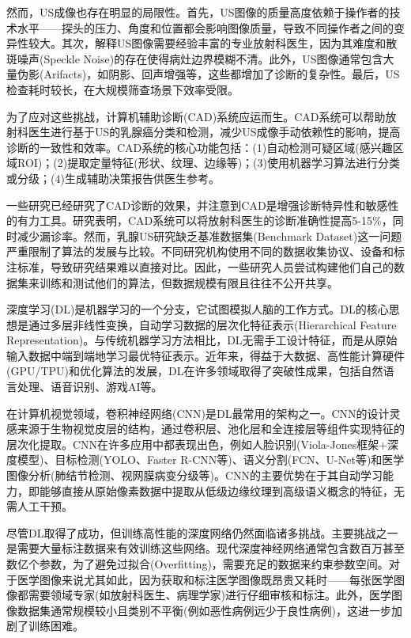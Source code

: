 \documentclass[supercite]{../Hust-undergraduate-translation/Experimental_Report}
\theoremstyle{definition}
\begin{document}
然而，US成像也存在明显的局限性。首先，US图像的质量高度依赖于操作者的技术水平——探头的压力、角度和位置都会影响图像质量，导致不同操作者之间的变异性较大。其次，解释US图像需要经验丰富的专业放射科医生，因为其难度和散斑噪声(Speckle Noise)的存在使得病灶边界模糊不清。此外，US图像通常包含大量伪影(Arifacts)，如阴影、回声增强等，这些都增加了诊断的复杂性。最后，US检查耗时较长，在大规模筛查场景下效率受限。

为了应对这些挑战，计算机辅助诊断(CAD)系统应运而生。CAD系统可以帮助放射科医生进行基于US的乳腺癌分类和检测，减少US成像手动依赖性的影响，提高诊断的一致性和效率。CAD系统的核心功能包括：(1)自动检测可疑区域(感兴趣区域ROI)；(2)提取定量特征(形状、纹理、边缘等)；(3)使用机器学习算法进行分类或分级；(4)生成辅助决策报告供医生参考。

一些研究已经研究了CAD诊断的效果，并注意到CAD是增强诊断特异性和敏感性的有力工具。研究表明，CAD系统可以将放射科医生的诊断准确性提高5-15\%，同时减少漏诊率。然而，乳腺US研究缺乏基准数据集(Benchmark Dataset)这一问题严重限制了算法的发展与比较。不同研究机构使用不同的数据收集协议、设备和标注标准，导致研究结果难以直接对比。因此，一些研究人员尝试构建他们自己的数据集来训练和测试他们的算法，但数据规模有限且往往不公开共享。

深度学习(DL)是机器学习的一个分支，它试图模拟人脑的工作方式。DL的核心思想是通过多层非线性变换，自动学习数据的层次化特征表示(Hierarchical Feature Representation)。与传统机器学习方法相比，DL无需手工设计特征，而是从原始输入数据中端到端地学习最优特征表示。近年来，得益于大数据、高性能计算硬件(GPU/TPU)和优化算法的发展，DL在许多领域取得了突破性成果，包括自然语言处理、语音识别、游戏AI等。

在计算机视觉领域，卷积神经网络(CNN)是DL最常用的架构之一。CNN的设计灵感来源于生物视觉皮层的结构，通过卷积层、池化层和全连接层等组件实现特征的层次化提取。CNN在许多应用中都表现出色，例如人脸识别(Viola-Jones框架+深度模型)、目标检测(YOLO、Faster R-CNN等)、语义分割(FCN、U-Net等)和医学图像分析(肺结节检测、视网膜病变分级等)。CNN的主要优势在于其自动学习能力，即能够直接从原始像素数据中提取从低级边缘纹理到高级语义概念的特征，无需人工干预。

尽管DL取得了成功，但训练高性能的深度网络仍然面临诸多挑战。主要挑战之一是需要大量标注数据来有效训练这些网络。现代深度神经网络通常包含数百万甚至数亿个参数，为了避免过拟合(Overfitting)，需要充足的数据来约束参数空间。对于医学图像来说尤其如此，因为获取和标注医学图像既昂贵又耗时——每张医学图像都需要领域专家(如放射科医生、病理学家)进行仔细审核和标注。此外，医学图像数据集通常规模较小且类别不平衡(例如恶性病例远少于良性病例)，这进一步加剧了训练困难。
\end{document}
